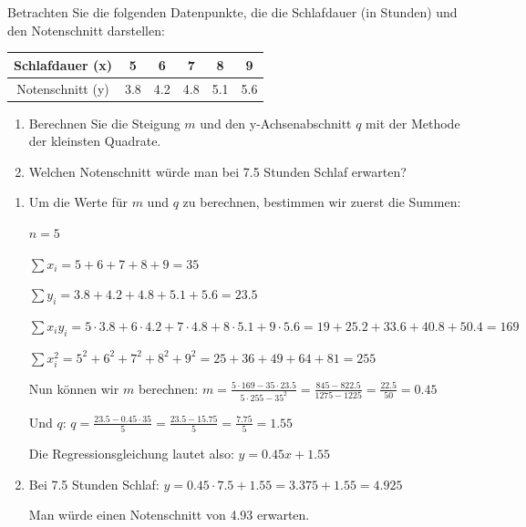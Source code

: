 \begin{mychallenge}
	Betrachten Sie die folgenden Datenpunkte, die die Schlafdauer (in Stunden) und den Notenschnitt darstellen:
	\begin{center}
		\begin{tabular}{c||c|c|c|c|c}
			Schlafdauer (x)  & 5   & 6   & 7   & 8   & 9   \\\midrule
			Notenschnitt (y) & 3.8 & 4.2 & 4.8 & 5.1 & 5.6
		\end{tabular}
	\end{center}

	\begin{enumerate}
		\item Berechnen Sie die Steigung $m$ und den y-Achsenabschnitt $q$ mit der Methode der kleinsten Quadrate.
		\item Welchen Notenschnitt würde man bei 7.5 Stunden Schlaf erwarten?
	\end{enumerate}

	\begin{myanswer}
		\begin{enumerate}
			\item Um die Werte für $m$ und $q$ zu berechnen, bestimmen wir zuerst die Summen:

			      $n = 5$

			      $\sum x_i = 5 + 6 + 7 + 8 + 9 = 35$

			      $\sum y_i = 3.8 + 4.2 + 4.8 + 5.1 + 5.6 = 23.5$

			      $\sum x_i y_i = 5 \cdot 3.8 + 6 \cdot 4.2 + 7 \cdot 4.8 + 8 \cdot 5.1 + 9 \cdot 5.6 = 19 + 25.2 + 33.6 + 40.8 + 50.4 = 169$

			      $\sum x_i^2 = 5^2 + 6^2 + 7^2 + 8^2 + 9^2 = 25 + 36 + 49 + 64 + 81 = 255$

			      Nun können wir $m$ berechnen:
			      $m = \frac{5 \cdot 169 - 35 \cdot 23.5}{5 \cdot 255 - 35^2} = \frac{845 - 822.5}{1275 - 1225} = \frac{22.5}{50} = 0.45$

			      Und $q$:
			      $q = \frac{23.5 - 0.45 \cdot 35}{5} = \frac{23.5 - 15.75}{5} = \frac{7.75}{5} = 1.55$

			      Die Regressionsgleichung lautet also: $y = 0.45x + 1.55$

			\item Bei 7.5 Stunden Schlaf: $y = 0.45 \cdot 7.5 + 1.55 = 3.375 + 1.55 = 4.925$

			      Man würde einen Notenschnitt von 4.93 erwarten.
		\end{enumerate}
	\end{myanswer}
\end{mychallenge}

